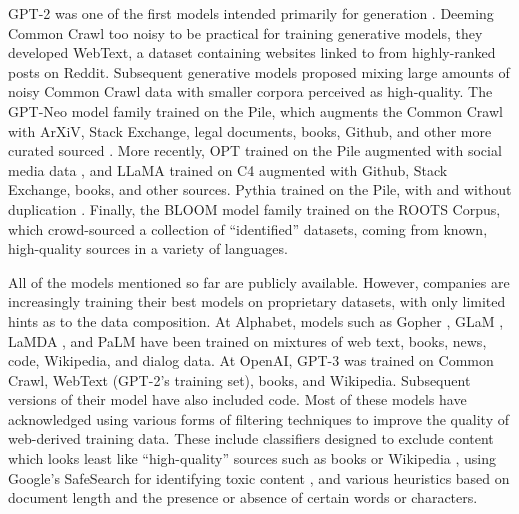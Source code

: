\documentclass{article}
\begin{document}
GPT-2 was one of the first models intended primarily for generation \citep{radford2019language}.
Deeming Common Crawl too noisy to be practical for training generative models, they developed WebText, a dataset containing websites linked to from highly-ranked posts on Reddit.
Subsequent generative models proposed mixing large amounts of noisy Common Crawl data with smaller corpora perceived as high-quality.
The GPT-Neo model family \citep{black2022gpt} trained on the Pile, which augments the Common Crawl with ArXiV, Stack Exchange, legal documents, books, Github, and other more curated sourced \citep{gao2020pile}.
More recently, OPT \citep{zhang2022opt} trained on the Pile augmented with social media data \citep{baumgartner2020pushshift}, and LLaMA \citep{touvron2023llama} trained on C4 augmented with Github, Stack Exchange, books, and other sources. Pythia trained on the Pile, with and without duplication \citep{biderman2023pythia}.
Finally, the BLOOM model family \citep{scao2022bloom} trained on the ROOTS Corpus, which crowd-sourced a collection of ``identified'' datasets, coming from known, high-quality sources in a variety of languages.

All of the models mentioned so far are publicly available.
However, companies are increasingly training their best models on proprietary datasets, with only limited hints as to the data composition.
At Alphabet, models such as Gopher \citep{rae2021scaling}, GLaM \citep{du_glam_2021} , LaMDA \citep{thoppilan2022lamda}, and PaLM \citep{chowdhery2022palm} have been trained on mixtures of web text, books, news, code, Wikipedia, and dialog data.
At OpenAI, GPT-3 \citep{brown2020language} was trained on Common Crawl, WebText (GPT-2's training set), books, and Wikipedia.
Subsequent versions of their model have also included code.
Most of these models have acknowledged using various forms of filtering techniques to improve the quality of web-derived training data.
These include classifiers designed to exclude content which looks least like ``high-quality'' sources such as books or Wikipedia \citep{chowdhery2022palm,ouyang2022training}, using Google's SafeSearch for identifying toxic content \citep{rae2021scaling}, and various heuristics based on document length and the presence or absence of certain words or characters.

\vspace{-3mm}
\end{document}
